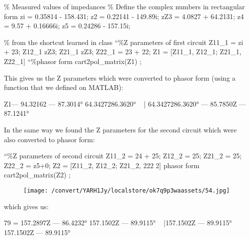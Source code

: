 \documentclass[12pt]{report}
\begin{document}
    \% Measured values of impedances  \% Define the complex numbers in rectangular form  zi = 0.35814 - 158.431;    z2 = 0.22141 - 149.89i;  zZ3 = 4.0827 + 64.2131;  z4 = 9.57 + 0.16666i;    z5 = 0.24286 - 157.15i; 

\vspace{10pt}

    \% from the shortcut learned in class  “\%Z parameters of first circuit   Z11\_1 = zi + 23;   Z12\_1 zZ3;   Z21\_1 zZ3;   Z22\_1 = 23 + 22;   Z1 = [Z11\_1, Z12\_1; Z21\_1, Z22\_1]  “\%phasor form   cart2pol\_matrix(Z1) ; 

\vspace{10pt}

    This gives us the Z parameters which were converted to phasor form (using  a function that we defined on MATLAB): 

\vspace{10pt}

    Z1— 94.32162 — 87.3014° 64.3427286.3620°  ~ | 64.3427286.3620° — 85.7850Z — 87.1241° 

\vspace{10pt}

    In the same way we found the Z parameters for the second circuit which were  also converted to phasor form: 

\vspace{10pt}

    “\%Z parameters of second circuit    Z11\_2 = 24 + 25;  Z12\_2 = 25;  Z21\_2 = 25;  Z22\_2 = z5+0;    Z2 = [Z11\_2, Z12\_2; Z21\_2, 222 2]  phasor form  cart2pol\_matrix(Z2) ; 

\vspace{10pt}

\begin{figure}[h]

\texttt{[image: /convert/YARH1Jy/localstore/ok7q9p3waassets/54.jpg]}

\centering

\end{figure}

\par

\vspace{10pt}

    which gives us: 

\vspace{10pt}

    79 = 157.2897Z — 86.4232° 157.1502Z — 89.9115°  ~ |157.1502Z — 89.9115°  157.1502Z — 89.9115° 
\end{document}
